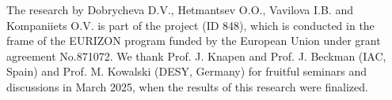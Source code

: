 \documentclass{aa}
\begin{document}
\begin{acknowledgements}

The research by Dobrycheva D.V., Hetmantsev O.O., Vavilova I.B. and Kompaniiets O.V. is part of the project (ID 848), which is conducted in the frame of the EURIZON program funded by the European Union under grant agreement No.871072. We thank Prof. J. Knapen and Prof. J. Beckman (IAC, Spain) and Prof. M. Kowalski (DESY, Germany) for fruitful seminars and discussions in March 2025, when the results of this research were finalized.

\end{acknowledgements}

\end{document}
